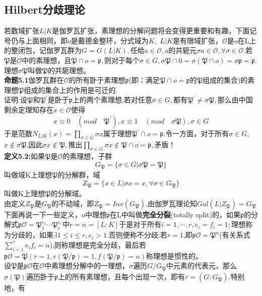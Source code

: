 \documentclass[UTF8]{article}
\begin{document}
    \subsection{Hilbert分歧理论}
若数域扩张$L|K$是伽罗瓦扩张，素理想的分解问题将会变得更重要和有趣，下面记号仍与上面相同，即$o$是戴德金整环，分式域为$K,$ $L|K$是有限域扩张，$\mathcal{O}$是o在L上的整闭包，记伽罗瓦群为$G=G(L|K),$任给$a \in \mathcal{O},$a的共轭元$\sigma a \in \mathcal{O},\forall \sigma \in \mathcal{O}.$若$\mathfrak{P}$是$\mathcal{O}$中的素理想，且$\mathfrak{P}\cap o=\mathfrak{p},$则对于每个$\sigma \in G,\sigma \mathfrak{P}\cap 0=\sigma(\mathfrak{P}\cap o)=\sigma \mathfrak{p}=\mathfrak{p}.$理想$\sigma \mathfrak{P}$叫做$\mathfrak{P}$的共轭理想。\\
\textbf{命题5.1}伽罗瓦群在$\mathcal{O}$的所有卧于素理想$\mathfrak{p}$(即：满足$\mathfrak{P}\cap o=\mathfrak{p}$的$\mathfrak{P}$组成的集合)的素理想$\mathfrak{P}$组成的集合上的作用是可迁的.\\
证明:设$\mathfrak{P}$和$\mathfrak{P}^{'}$是卧于$\mathfrak{p}$上的两个素理想,若对任意$\sigma \in G,$都有$\mathfrak{P}^{'}\neq \sigma \mathfrak{P},$那么由中国剩余定理知存在$x\in \mathcal{O}$使得
$$
x\equiv 0\quad (mod \quad \mathfrak{P}^{'}),x\equiv 1\quad(mod\quad  \mathcal{\sigma \mathfrak{P}}),\sigma \in G
$$
于是范数$N_{L|K}(x)=\prod _{\sigma \in G}\sigma x$属于理想$\mathfrak{P}^{'}\cap o=\mathfrak{p}.$令一方面，对于所有$\sigma \in G,$$x\notin \sigma  \mathfrak{P}$,因此$\sigma x\notin \mathfrak{P},$推出$\prod _{\sigma \in G}\sigma x\notin \mathfrak{P}\cap o=\mathfrak{p},$矛盾！\\
\textbf{定义5.2:}如果$\mathfrak{P}$是$\mathcal{O}$的素理想，子群$$
G_{\mathfrak{P}}=\{\sigma \in G|\sigma \mathfrak{P}=\mathfrak{P}\}
$$
叫做域K上理想$\mathfrak{P}$的分解群，域$$
Z_{\mathfrak{P}}=\{x\in L|\sigma x=x ,\forall \sigma \in G_{\mathfrak{P}}\}
$$
叫做K上理想$\mathfrak{P}$的分解域。\\
由定义$Z_{\mathfrak{P}}$是$G_{\mathfrak{P}}$的不动域，即$Z_{\mathfrak{P}}=Inv(G_{\mathfrak{P}})$,由伽罗瓦理论知$Gal(L|Z_{\mathfrak{P}})=G_{\mathfrak{P}}$\\
下面再说一下一些定义，o中理想$\mathfrak{p}$在L中叫做\textbf{完全分裂}(totally split)的，如果$\mathfrak{p}$的分解式$\mathfrak{p}\mathcal{O}=\mathfrak{P}_{1}^{e_{1}}\cdots \mathfrak{P}_{r}^{e_{r}}$中$r=n=[L:K]$于是对于所有$i=1,\cdots ,r ,e_{i}=f_{i}=1;$理想称为分歧的，如果$\exists 1\leq i\leq r,e_{i}>1.$否则便称不分歧;若$r=1$,即$\mathfrak{p}\mathcal{O}=\mathfrak{P}^{n}$(有关系式$\sum_{i=1}^{r}e_{i}f_{i}=n$),则称理想是完全分歧，最后若$\mathfrak{p}\mathcal{O}=\mathfrak{P}(r=1,e(\mathfrak{P}/\mathfrak{p})=1,f(\mathfrak{P}/\mathfrak{p})=n)$称理想是惯性的。\\
设$\mathfrak{P}$是$\mathfrak{p}\mathcal{O}$在$\mathcal{O}$中素理想分解中的一理想，$\sigma$遍历$G/G_{\mathfrak{P}}$中元素的代表元，那么$\sigma(\mathfrak{P})$遍历卧于$\mathfrak{p}$上的所有素理想，且每个出现一次，即有$r=(G:G_{\mathfrak{P}}).$特别地，有$$
\end{document}
